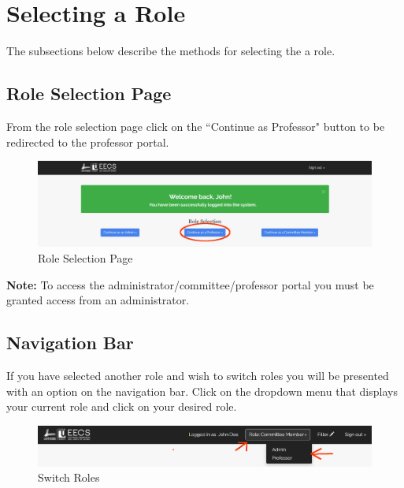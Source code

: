 \documentclass[fontsize=12pt,paper=letter,twoside]{scrartcl}
\begin{document}
\clearpage

\section{Selecting a Role}
The subsections below describe the methods for selecting the a role.

\subsection{Role Selection Page}
From the role selection page click on the ``Continue as Professor" button to be redirected to the professor portal.

\begin{figure}[!htb]
\begin{center}
\includegraphics[width=.99\textwidth]{images/role-selection.png}
\end{center}
\caption{Role Selection Page}
\label{fig:role_selection1}
\end{figure}

\noindent \textbf{Note:} To access the administrator/committee/professor portal you must be granted access from an administrator.

\subsection{Navigation Bar}
If you have selected another role and wish to switch roles you will be presented with an option on the navigation bar. Click on the dropdown menu that displays your current role and click on your desired role.
\begin{figure}[!htb]
\begin{center}
\includegraphics[width=.99\textwidth]{images/role-selection2.png}
\end{center}
\caption{Switch Roles}
\label{fig:role_selection2}
\end{figure}
\end{document}
